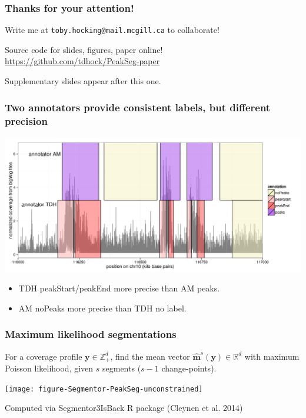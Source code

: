\documentclass{beamer}
\newcommand{\RR}{\mathbb R}
\newcommand{\ZZ}{\mathbb Z}
\begin{document}
\begin{frame}
  \frametitle{Thanks for your attention!}
  Write me at \alert{\texttt{toby.hocking@mail.mcgill.ca}} to collaborate!

  \vskip 1cm

  Source code for slides, figures, paper online!\\
  \small
  \url{https://github.com/tdhock/PeakSeg-paper}
  \vskip 1cm

  Supplementary slides appear after this one.

\end{frame}

\begin{frame}
  \frametitle{Two annotators provide consistent labels, but different
    precision}
  \includegraphics[width=1.1\textwidth]{figure-several-annotators}

  \begin{itemize}
  \item TDH peakStart/peakEnd more precise than AM peaks.
  \item AM noPeaks more precise than TDH no label.
  \end{itemize}
\end{frame}


\begin{frame}
  \frametitle{Maximum likelihood segmentations}
  For a coverage profile $\mathbf y\in\ZZ_+^d$,
  find the mean vector $\mathbf{\hat m}^s(\mathbf y)\in\RR^d$ with
  maximum Poisson likelihood, given $s$ segments ($s-1$ change-points).

  \texttt{[image: figure-Segmentor-PeakSeg-unconstrained]}

  Computed via Segmentor3IsBack R package (Cleynen et al. 2014)

\end{frame}
\end{document}
